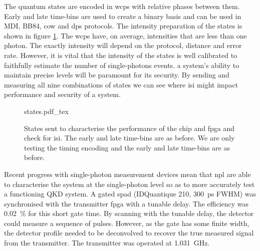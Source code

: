 
The quantum states are encoded in \acp{wcp} with relative phases between them. Early and late time-bins are used to create a binary basis and can be used in \ac{MDI}, BB84, \ac{cow} and \ac{dps} protocols. The intensity preparation of the states is shown in figure \ref{fig:isi_states}. The \acp{wcp} have, on average, intensities that are less than one photon. The exactly intensity will depend on the protocol, distance and error rate. However, it is vital that the intensity of the states is well calibrated to faithfully estimate the number of single-photons events. a system's ability to maintain precise levels will be paramount for its security. By sending and measuring all nine combinations of states we can see where \ac{isi} might impact performance and security of a system.

\begin{figure}[t]
	\centering
	\def\svgwidth{0.9\textwidth} 
	{states.pdf_tex}
	\caption[States sent for ISI calibration]{States sent to characterise the performance of the chip and \ac{fpga} and check for \ac{isi}. The early and late time-bins are as before. We are only testing the timing encoding and the early and late time-bins are as before.}
	\label{fig:isi_states}
\end{figure}

Recent progress with single-photon measurement devices mean that \ac{npl} are able to characterise the system at the single-photon level so as to more accurately test a functioning \ac{QKD} system. A gated \ac{spad} (IDQuantique 210, \SI{300}{ps} \ac{FWHM}) was synchronised with the transmitter \ac{fpga} with a tunable delay. The efficiency was \SI{0.02}{\percent} for this short gate time. By scanning with the tunable delay, the detector could measure a sequence of pulses. However, as the gate has some finite width, the detector profile needed to be deconvolved to recover the true measured signal from the transmitter. The transmitter was operated at \SI{1.031}{GHz}. 




